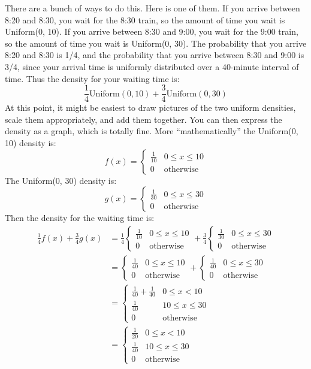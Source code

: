 \documentclass[12pt]{article}
\begin{document}
\begin{enumerate}
\begin{enumerate}
There are a bunch of ways to do this. Here is one of them. If you arrive between 8:20 and 8:30, you wait for the 8:30 train, so the amount of time you wait is Uniform(0, 10). If you arrive between 8:30 and 9:00, you wait for the 9:00 train, so the amount of time you wait is Uniform(0, 30). The probability that you arrive 8:20 and 8:30 is 1/4, and the probability that you arrive between 8:30 and 9:00 is 3/4, since your arrival time is uniformly distributed over a 40-minute interval of time. Thus the density for your waiting time is:
\[
\frac{1}{4} \text{Uniform}(0, 10) + \frac{3}{4} \text{Uniform}(0, 30)
\]
At this point, it might be easiest to draw pictures of the two uniform densities, scale them appropriately, and add them together. You can then express the density as a graph, which is totally fine. More ``mathematically'' the Uniform(0, 10) density is:
\[
f(x) = \begin{cases}
\frac{1}{10} & 0 \leq x \leq 10 \\
0 & \text{otherwise}
\end{cases}
\]
The Uniform(0, 30) density is:
\[
g(x) = \begin{cases}
\frac{1}{30} & 0 \leq x \leq 30 \\
0 & \text{otherwise}
\end{cases}
\]
Then the density for the waiting time is:
\begin{align*}
\frac{1}{4} f(x) + \frac{3}{4} g(x) &= \frac{1}{4} \begin{cases}
\frac{1}{10} & 0 \leq x \leq 10 \\
0 & \text{otherwise}
\end{cases} + \frac{3}{4} \begin{cases}
\frac{1}{30} & 0 \leq x \leq 30 \\
0 & \text{otherwise}
\end{cases} \\
&= \begin{cases}
\frac{1}{40} & 0 \leq x \leq 10 \\
0 & \text{otherwise}
\end{cases} + \begin{cases}
\frac{1}{40} & 0 \leq x \leq 30 \\
0 & \text{otherwise}
\end{cases}\\
&= \begin{cases}
\frac{1}{40} + \frac{1}{40} & 0 \leq x < 10 \\
\frac{1}{40} & 10 \leq x \leq 30 \\
0 & \text{otherwise}
\end{cases}\\
&= \begin{cases}
\frac{1}{20} & 0 \leq x < 10 \\
\frac{1}{40} & 10 \leq x \leq 30 \\
0 & \text{otherwise}
\end{cases}
\end{align*}


\end{enumerate}
\end{enumerate}
\end{document}
